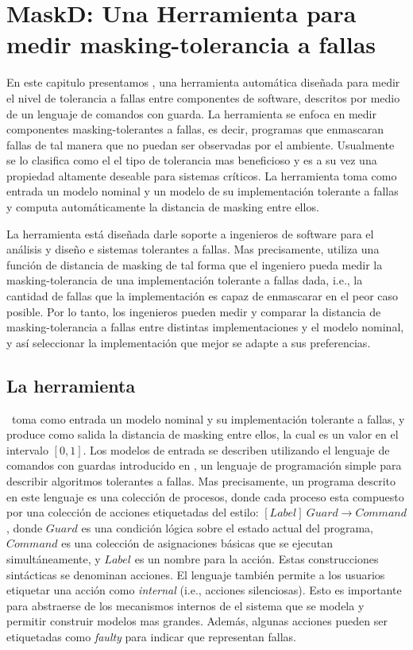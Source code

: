 \chapter{MaskD: Una Herramienta para medir masking-tolerancia a fallas}
\label{cap:maskD}

En este capitulo presentamos {\MaskD}, una herramienta automática diseñada para medir el nivel de tolerancia a fallas entre componentes de software, 
descritos por medio de un lenguaje de comandos con guarda.
La herramienta se enfoca en medir componentes masking-tolerantes a fallas, es decir, programas que enmascaran fallas de tal manera que no puedan ser observadas por el ambiente. Usualmente se lo clasifica como el el tipo de tolerancia mas beneficioso y es a su vez una propiedad altamente deseable para sistemas críticos. 
La herramienta toma como entrada un modelo nominal y un modelo de su implementación tolerante a fallas y computa automáticamente la distancia de masking entre ellos. 

La herramienta está diseñada darle soporte a ingenieros de software para el análisis y diseño e sistemas tolerantes a fallas. Mas precisamente, utiliza una función de distancia de masking de tal forma que el ingeniero pueda medir la masking-tolerancia de una implementación tolerante a fallas dada, i.e., la cantidad de fallas que la implementación es capaz de enmascarar en el peor caso posible. 
Por lo tanto, los ingenieros pueden medir y comparar la distancia de masking-tolerancia a fallas entre distintas implementaciones y el modelo nominal, y así seleccionar la implementación que mejor se adapte a sus preferencias.

\section{La herramienta \MaskD} \label{sec:mask_sec}

\MaskD~toma como entrada un modelo nominal y su implementación tolerante a fallas, y produce como salida la distancia de masking entre ellos, la cual es un valor en el intervalo $[0,1]$.
Los modelos de entrada se describen utilizando el lenguaje de comandos con guardas introducido en \cite{AroraGouda93}, un lenguaje de programación simple para describir algoritmos tolerantes a fallas.
Mas precisamente, un programa descrito en este lenguaje es una colección de procesos, donde cada proceso esta compuesto por una colección de acciones etiquetadas del estilo: $[Label]~Guard \rightarrow Command$, donde $Guard$ es una condición lógica sobre el estado actual del programa, $Command$ es una colección de asignaciones básicas que se ejecutan simultáneamente, y $Label$ es un nombre para la acción.
Estas construcciones sintácticas se denominan acciones. El lenguaje también permite a los usuarios etiquetar una acción como \emph{internal} (i.e., acciones silenciosas). Esto es importante para abstraerse de los mecanismos internos de el sistema que se modela y permitir construir modelos mas grandes. Además, algunas acciones pueden ser etiquetadas como \emph{faulty} para indicar que representan fallas. 


